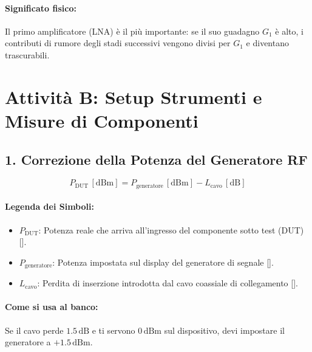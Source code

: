 \documentclass[openany,a4paper,12pt]{book}
\begin{document}
\paragraph{Significato fisico:}
Il primo amplificatore (LNA) è il più importante: se il suo guadagno $G_1$ è alto, i contributi di rumore degli stadi successivi vengono divisi per $G_1$ e diventano trascurabili.

\newpage

\section{Attività B: Setup Strumenti e Misure di Componenti}

\subsection{1. Correzione della Potenza del Generatore RF}

\begin{tcolorbox}[title=Formula di Compensazione del Cavo]
\[
P_{\text{DUT}} \, [\text{dBm}] = P_{\text{generatore}} \, [\text{dBm}] - L_{\text{cavo}} \, [\text{dB}]
\]
\end{tcolorbox}

\paragraph{Legenda dei Simboli:}
\begin{itemize}
    \item $P_{\text{DUT}}$: Potenza reale che arriva all'ingresso del componente sotto test (DUT) [].
    \item $P_{\text{generatore}}$: Potenza impostata sul display del generatore di segnale [].
    \item $L_{\text{cavo}}$: Perdita di inserzione introdotta dal cavo coassiale di collegamento [].
\end{itemize}

\paragraph{Come si usa al banco:}
Se il cavo perde $1.5\,\text{dB}$ e ti servono $0\,\text{dBm}$ sul dispositivo, devi impostare il generatore a $+1.5\,\text{dBm}$.

\end{document}
